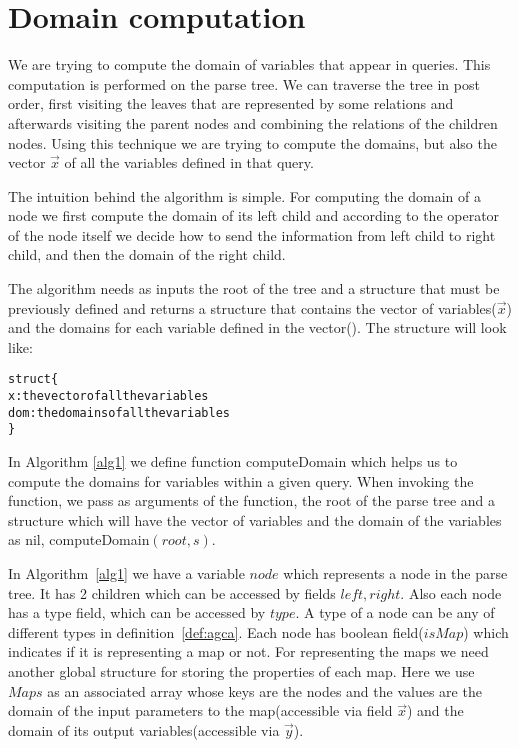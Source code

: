 \documentclass[12pt]{article}
\begin{document}
\section{Domain computation}

We are trying to compute the domain of variables that appear in queries. This computation is performed on the parse tree. We can traverse the tree in post order, first visiting the leaves that are represented by some relations and afterwards visiting the parent nodes and combining the relations of the children nodes. Using this technique we are trying to compute the domains, but also the vector $\vec x$ of all the variables defined in that query.

The intuition behind the algorithm is simple. For computing the domain of a node we first compute the domain of its left child and according to the operator of the node itself we decide how to send the information from left child to right child, and then the domain of the right child.

The algorithm needs as inputs the root of the tree and a structure that must be previously defined and returns a structure that contains the vector of variables($\vec{x}$) and the domains for each variable defined in the vector(\dom). The structure will look like:

\begin{alltt}
struct \{
x: the vector of all the variables 
dom: the domains of all the variables
\}
\end{alltt}

In Algorithm \ref{alg1} we define function \textsf{computeDomain} which helps us to compute the domains for variables within a given query. When invoking the function, we pass as arguments of the function, the root of the parse tree and a structure which will have the vector of variables and the domain of the variables as nil, \textsf{computeDomain}$(root,s)$.
\par
In Algorithm~\ref{alg1} we have a variable $node$ which represents a node in the parse tree. It has 2 children which can be accessed by fields $left, right$. Also each node has a type field, which can be accessed by $type$. A type of a node can be any of different types in definition~\eqref{def:agca}. Each node has boolean field($isMap$) which indicates if it is representing a map or not. 
For representing the maps we need another global structure for storing the properties of each map. Here we use $Maps$ as an associated array whose keys are the nodes and the values are the domain of the input parameters to the map(accessible via field $\vec{x}$) and the domain of its output variables(accessible via $\vec{y}$). 
\end{document}
